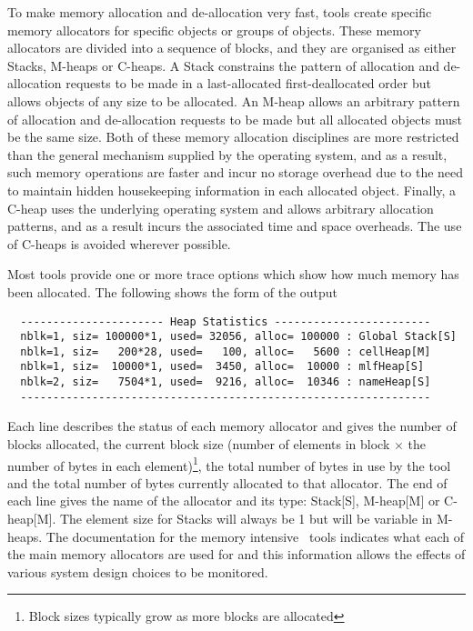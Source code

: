 To make memory allocation and de-allocation very fast,
tools create specific memory allocators for specific objects or groups of
objects.  These memory allocators are divided into a sequence of blocks, and
they are organised as either Stacks, M-heaps or
C-heaps.  A Stack constrains the pattern of allocation and
de-allocation requests to be made in a last-allocated first-deallocated order
but allows objects of any size to be allocated. An M-heap allows an arbitrary
pattern of allocation and de-allocation requests to be made but all allocated
objects must be the same size.  Both of these memory allocation disciplines are
more restricted than the general mechanism supplied by the operating system,
and as a result, such memory operations are faster and incur no storage
overhead due to the need to maintain hidden housekeeping information in each
allocated object.  Finally, a C-heap uses the underlying operating system and
allows arbitrary allocation patterns, and as a result incurs the associated
time and space overheads.  The use of C-heaps is avoided wherever possible.

Most tools provide one or more trace options which show how
much memory has been allocated.  The following shows the form of
the output
\begin{verbatim}
  ---------------------- Heap Statistics ------------------------
  nblk=1, siz= 100000*1, used= 32056, alloc= 100000 : Global Stack[S]
  nblk=1, siz=   200*28, used=   100, alloc=   5600 : cellHeap[M]
  nblk=1, siz=  10000*1, used=  3450, alloc=  10000 : mlfHeap[S]
  nblk=2, siz=   7504*1, used=  9216, alloc=  10346 : nameHeap[S]
  ---------------------------------------------------------------
\end{verbatim}
Each line describes the status of each memory allocator and gives the number of
blocks allocated, the current block size (number of elements in block $\times$
the number of bytes in each element)\footnote{ Block sizes typically grow as
more blocks are allocated}, the total number of bytes in use by the tool and
the total number of bytes currently allocated to that allocator.  The end of
each line gives the name of the allocator and its type: Stack[S], M-heap[M] or
C-heap[M].  The element size for Stacks will always be 1 but will be variable
in M-heaps. The documentation for the memory
intensive \HTK\ tools indicates what each of the main memory allocators are
used for and this information allows the effects of various system design
choices to be monitored.

